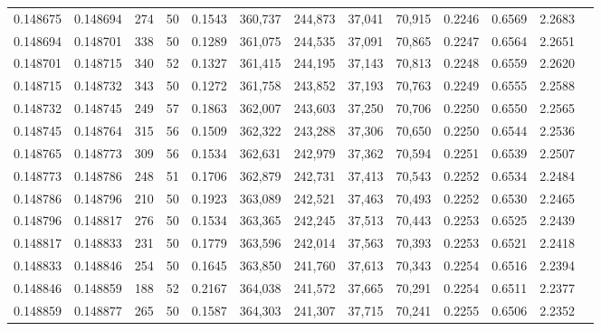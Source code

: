 \begin{tabular}{rrrrrrrrrrrrr}
0.148675 & 0.148694 &   274 &  50 &                                     0.1543 & 360,737 & 244,873 &  37,041 &  70,915 & 0.2246 & 0.6569 & 2.2683 \\
0.148694 & 0.148701 &   338 &  50 &                                     0.1289 & 361,075 & 244,535 &  37,091 &  70,865 & 0.2247 & 0.6564 & 2.2651 \\
0.148701 & 0.148715 &   340 &  52 &                                     0.1327 & 361,415 & 244,195 &  37,143 &  70,813 & 0.2248 & 0.6559 & 2.2620 \\
0.148715 & 0.148732 &   343 &  50 &                                     0.1272 & 361,758 & 243,852 &  37,193 &  70,763 & 0.2249 & 0.6555 & 2.2588 \\
0.148732 & 0.148745 &   249 &  57 &                                     0.1863 & 362,007 & 243,603 &  37,250 &  70,706 & 0.2250 & 0.6550 & 2.2565 \\
0.148745 & 0.148764 &   315 &  56 &                                     0.1509 & 362,322 & 243,288 &  37,306 &  70,650 & 0.2250 & 0.6544 & 2.2536 \\
0.148765 & 0.148773 &   309 &  56 &                                     0.1534 & 362,631 & 242,979 &  37,362 &  70,594 & 0.2251 & 0.6539 & 2.2507 \\
0.148773 & 0.148786 &   248 &  51 &                                     0.1706 & 362,879 & 242,731 &  37,413 &  70,543 & 0.2252 & 0.6534 & 2.2484 \\
0.148786 & 0.148796 &   210 &  50 &                                     0.1923 & 363,089 & 242,521 &  37,463 &  70,493 & 0.2252 & 0.6530 & 2.2465 \\
0.148796 & 0.148817 &   276 &  50 &                                     0.1534 & 363,365 & 242,245 &  37,513 &  70,443 & 0.2253 & 0.6525 & 2.2439 \\
0.148817 & 0.148833 &   231 &  50 &                                     0.1779 & 363,596 & 242,014 &  37,563 &  70,393 & 0.2253 & 0.6521 & 2.2418 \\
0.148833 & 0.148846 &   254 &  50 &                                     0.1645 & 363,850 & 241,760 &  37,613 &  70,343 & 0.2254 & 0.6516 & 2.2394 \\
0.148846 & 0.148859 &   188 &  52 &                                     0.2167 & 364,038 & 241,572 &  37,665 &  70,291 & 0.2254 & 0.6511 & 2.2377 \\
0.148859 & 0.148877 &   265 &  50 &                                     0.1587 & 364,303 & 241,307 &  37,715 &  70,241 & 0.2255 & 0.6506 & 2.2352 \\

\end{tabular}
